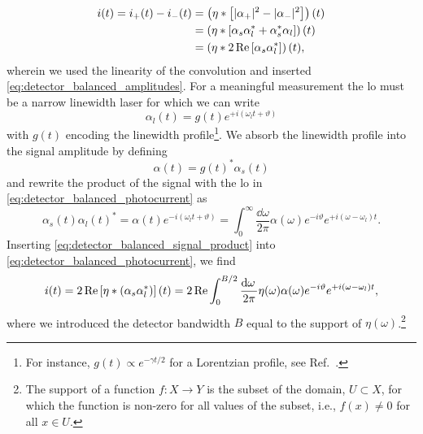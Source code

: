 \begin{equation}
	\begin{split}
		i(t)
		=
		i_+(t)
		-
		i_-(t)
		&=
		\left(
			\eta
			\ast
			\left[
				\lvert\alpha_+\rvert^2
				-
				\lvert\alpha_-\rvert^2
			\right]		
		\right)(t)
		\\
		&=
		\left(
			\eta
			\ast
			\left[
				\alpha_s
				\alpha_l^*
				+
				\alpha_s^*
				\alpha_l
			\right]
		\right)(t)
		\\
		&=
		\left(
			\eta
			\ast
			2\operatorname{Re}\left[
				\alpha_s
				\alpha_l^*
			\right]
		\right)(t)
		,
	\end{split}
	\label{eq:detector_balanced_photocurrent}
\end{equation}
wherein we used the linearity of the convolution and inserted \cref{eq:detector_balanced_amplitudes}.
For a meaningful measurement the \gls{lo} must be a narrow linewidth laser for which we can write
\begin{equation}
	\alpha_l(t)
	=
	g(t)
	e^{+i(\omega_lt+\vartheta)}
	\label{eq:detector_balanced_lo}
\end{equation}
with $g(t)$ encoding the linewidth profile\footnote{For instance, $g(t)\propto e^{-\gamma t/2}$ for a Lorentzian profile, see Ref.~\cite{Demtroeder2014}.}.
We absorb the linewidth profile into the signal amplitude by defining
\begin{equation}
	\alpha(t)
	=
	g(t)^*
	\alpha_s(t)
\end{equation}
and rewrite the product of the signal with the \gls{lo} in \cref{eq:detector_balanced_photocurrent} as
\begin{equation}
	\alpha_s(t)
	\alpha_l(t)^*
	=
	\alpha(t)
	e^{-i(\omega_lt+\vartheta)}
	=
	\int_0^{\infty}
	\frac{\dd{\omega}}{2\pi}
	\alpha(\omega)
	e^{-i\vartheta}
	e^{+i(\omega-\omega_l) t}
	.
	\label{eq:detector_balanced_signal_product}
\end{equation}
Inserting \cref{eq:detector_balanced_signal_product} into \cref{eq:detector_balanced_photocurrent}, we find
\begin{equation}
	\begin{split}
		i(t)
		=
		2\Re\left[
			\eta
			\conv
			(\alpha_s\alpha_l^*)
		\right](t)
		=
		2\Re
		\int_0^{B/2}
		\frac{\dd{\omega}}{2\pi}
		\eta(\omega)
		\alpha(\omega)
		e^{-i\vartheta}
		e^{+i(\omega-\omega_l) t}
		,
	\end{split}
	\label{eq:detector_balanced_photocurrent_final}
\end{equation}
where we introduced the detector bandwidth $B$ equal to the support of $\eta(\omega)$.\footnote{The support of a function $f\colon X\to Y$ is the subset of the domain, $U\subset X$, for which the function is non-zero for all values of the subset, i.e., $f(x)\neq 0$ for all $x\in U$.}
